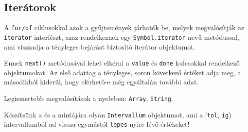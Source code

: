 \subsection{Iterátorok}

\begin{frame}
    \footnotesize
    A \texttt{for/of} ciklusokkal azok a gyűjtemények járhatók be, melyek megvalósítják az \texttt{iterator} interfészt,
    azaz rendelkeznek egy \texttt{Symbol.iterator} nevű metódussal, ami visszadja a tényleges bejárást biztosító
    iterátor objektumot.
    
    Ennek \texttt{next()} metódusával lehet elkérni a \texttt{value} és \texttt{done} kulcsokkal rendelkező objektumokat. 
    Az első adattag a tényleges, soron következő értéket adja meg, a másodikból kiderül, hogy elérhető-e még egyáltalán további adat.

    Legismertebb megvalósítások a nyelvben: \texttt{Array}, \texttt{String}.
    \begin{exampleblock}{}
        \scriptsize
        \vspace{-.2cm}
        
        \vspace{-.2cm}
    \end{exampleblock}
\end{frame}

\begin{frame}
    Készítsünk a  és 
    a  mintájára olyan \texttt{Intervallum}
    objektumot, ami a [\texttt{tol}, \texttt{ig}) intervallumból ad vissza egymástól \texttt{lepes}-nyire lévő értékeket!
    \begin{exampleblock}{}
        \small
        
    \end{exampleblock}
\end{frame}

\begin{frame}
    \footnotesize
    \begin{exampleblock}{}
        \scriptsize
        \vspace{-.2cm}
        
        \vspace{-.2cm}
    \end{exampleblock}
\end{frame}

